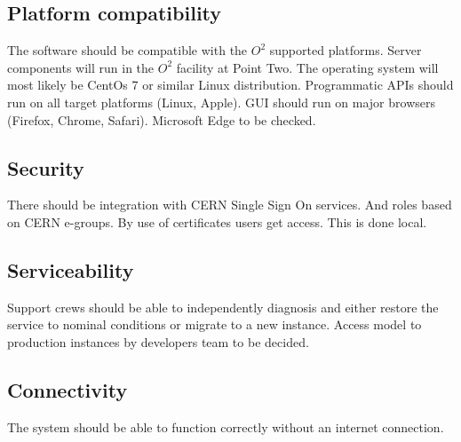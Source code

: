\subsection{Platform compatibility}
The software should be compatible with the $O^2$ supported platforms. Server components will run in the $O^2$ facility at Point Two. The operating system will most likely be CentOs 7 or similar Linux distribution. Programmatic APIs should run on all target platforms (Linux, Apple). GUI should run on major browsers (Firefox, Chrome, Safari). Microsoft Edge to be checked.

\subsection{Security}
There should be integration with CERN Single Sign On services. And roles based on CERN e-groups. By use of certificates users get access. This is done local.

\subsection{Serviceability}
Support crews should be able to independently diagnosis and either restore the service to nominal conditions or migrate to a new instance. Access model to production instances by developers team to be decided.

\subsection{Connectivity}
The system should be able to function correctly without an internet connection.
